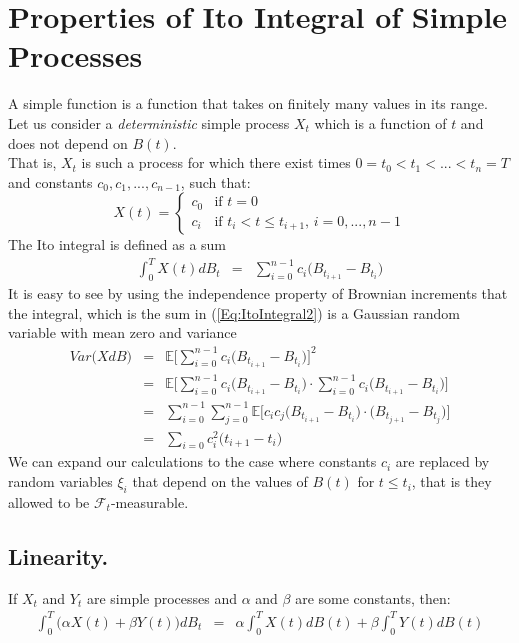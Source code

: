 \section{Properties of Ito Integral of Simple Processes}
A simple function is a function that takes on finitely many values in its range.\\
Let us consider a \textit{deterministic} simple process $X_{t}$ which is a function of $t$ and does not depend on $B(t)$.\\
That is, $X_{t}$ is such a process for which there exist times $0 = t_{0} < t_{1} < ... < t_{n} = T$ and constants $c_{0}, c_{1}, ..., c_{n - 1}$, such that:
\begin{equation}
	X(t) = \begin{cases}
	c_{0} & \text{if $t = 0$}\\
	c_{i} & \text{if $t_{i} < t \leq t_{i + 1}$, $i = 0, ..., n - 1$}
	\end{cases}
\end{equation}
The Ito integral is defined as a sum
\begin{eqnarray}
	\label{Eq:ItoIntegral2}
	\int_{0}^{T}X(t)dB_{t} &=& \sum_{i = 0}^{n - 1}c_{i}\Big(B_{t_{i + 1}} - B_{t_{i}}\Big)
\end{eqnarray}
It is easy to see by using the independence property of Brownian increments that the integral, which is the sum in (\ref{Eq:ItoIntegral2}) is a Gaussian random variable with mean zero and variance
\begin{eqnarray}
	\nonumber
	Var\Bigg(XdB\Bigg) &=& \mathbb{E}\Bigg[\sum_{i = 0}^{n - 1}c_{i}\bigg(B_{t_{i + 1}} - B_{t_{i}}\bigg)\Bigg]^{2}\\
	\nonumber
	&=& \mathbb{E}\Bigg[\sum_{i = 0}^{n - 1}c_{i}\bigg(B_{t_{i + 1}} - B_{t_{i}}\bigg) \cdot \sum_{i = 0}^{n - 1}c_{i}\bigg(B_{t_{i + 1}} - B_{t_{i}}\bigg)\Bigg]\\
	\nonumber
	&=& \sum_{i = 0}^{n - 1}\sum_{j = 0}^{n - 1}\mathbb{E}\Bigg[c_{i}c_{j}\bigg(B_{t_{i + 1}} - B_{t_{i}}\bigg) \cdot \bigg(B_{t_{j + 1}} - B_{t_{j}}\bigg)\Bigg]\\
	\nonumber
	&=& \sum_{i = 0}c_{i}^{2}\big(t_{i + 1} - t_{i}\big)
\end{eqnarray}
We can expand our calculations to the case where constants $c_{i}$ are replaced by random variables $\xi_{i}$ that depend on the values of $B(t)$ for $t \leq t_{i}$, that is they allowed to be $\mathcal{F}_{t}$-measurable. 

\subsection{Linearity.}If $X_{t}$ and $Y_{t}$ are simple processes and $\alpha$ and $\beta$ are some constants, then:
\begin{eqnarray}
	\label{Eq:ItoIntegralLinearity}
	\int_{0}^{T}\Big(\alpha X(t) + \beta Y(t)\Big)dB_{t} &=& \alpha\int_{0}^{T}X(t)dB(t) + \beta \int_{0}^{T}Y(t)dB(t)
\end{eqnarray}

